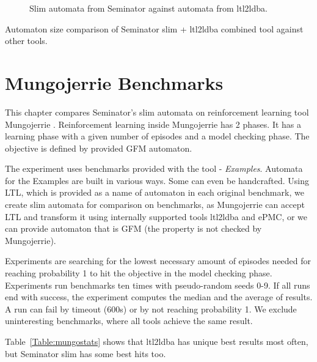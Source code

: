 \documentclass[
	digital,
nolof, nolot
]{fithesis3}
\begin{document}
		\clearpage
		\begin{figure}[ht]
			\centering
			
			\caption{Slim automata from Seminator against automata from ltl2ldba.}
			\label{scatter:seminator-ltl2ldba}
		\begin{tikzpicture}
		
		\end{tikzpicture}
		\end{figure}
	
	\begin{table}[ht]
		\centering
		
		\caption{Automaton size comparison of Seminator slim + ltl2ldba combined tool against other tools.}
		\label{table:basic-tools-mix}
		
	\end{table}

	\chapter{Mungojerrie Benchmarks}
	This chapter compares Seminator's slim automata on reinforcement learning tool Mungojerrie \cite{mungojerrie}. Reinforcement learning inside Mungojerrie has 2 phases. It has a learning phase with a given number of episodes and a model checking phase. The objective is defined by provided GFM automaton.\cite{mungojerrie}
	
	
	The experiment uses benchmarks provided with the tool - \emph{Examples}. Automata for the Examples are built in various ways. Some can even be handcrafted. Using LTL, which is provided as a name of automaton in each original benchmark, we create slim automata for comparison on benchmarks, as Mungojerrie can accept LTL and transform it using internally supported tools ltl2ldba and ePMC, or we can provide automaton that is GFM (the property is not checked by Mungojerrie).
	
	
	Experiments are searching for the lowest necessary amount of episodes needed for reaching probability 1 to hit the objective in the model checking phase. Experiments run benchmarks ten times with pseudo-random seeds 0-9. If all runs end with success, the experiment computes the median and the average of results. A run can fail by timeout (600s) or by not reaching probability 1. We exclude uninteresting benchmarks, where all tools achieve the same result. 
	
	Table~\ref{Table:mungostats} shows that ltl2ldba has unique best results most often, but Seminator slim has some best hits too.
	
\end{document}
